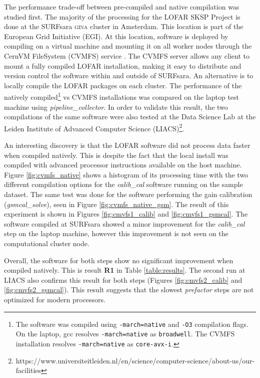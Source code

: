 The performance trade-off between pre-compiled and native compilation was studied first. The majority of the processing for the LOFAR SKSP Project \citep{lotss} is done at the SURFsara \textsc{gina} cluster in Amsterdam. This location is part of the European Grid Initiative (EGI)\citep{SurfSara}. At this location, software is deployed by compiling on a virtual machine and mounting it on all worker nodes through the CernVM FileSystem (CVMFS) service \citep{cvmfs}. The CVMFS server allows any client to mount a fully compiled LOFAR installation, making it easy to distribute and version control the software within and outside of SURFsara. An alternative is to locally compile the LOFAR packages on each cluster. The performance of the natively compiled\footnote{The software was compiled using \texttt{-march=native} and \texttt{-O3} compilation flags. On the laptop, gcc resolves \texttt{-march=native} as \texttt{broadwell}. The CVMFS installation resolves \texttt{-march=native} as \texttt{core-avx-i}.} vs CVMFS installations was compared on the laptop test machine using \textit{pipeline\_collector}. In order to validate this result, the two compilations of the same software were also tested at the Data Science Lab at the Leiden Institute of Advanced Computer Science (LIACS)\footnote{https://www.universiteitleiden.nl/en/science/computer-science/about-us/our-facilities}. 
 
An interesting discovery is that the LOFAR software did not process data faster when compiled natively. This is despite the fact that the local install was compiled with advanced processor instructions available on the host machine.  Figure \ref{fig:cvmfs_native} shows a histogram of its processing time with the two different compilation options for the \textit{calib\_cal} software running on the sample dataset. The same test was done for the software performing the gain calibration (\textit{gsmcal\_solve}), seen in Figure \ref{fig:cvmfs_native_gsm}. The result of this experiment is shown in Figures \ref{fig:cmvfs1_calib} and \ref{fig:cmvfs1_gsmcal}.  The software compiled at SURFsara showed a minor improvement for the \textit{calib\_cal} step on the laptop machine, however this improvement is not seen on the computational cluster node. 

Overall, the software for both steps show no significant improvement when compiled natively. This is result \textbf{R1} in Table \ref{table:results}. The second run at LIACS also confirms this result for both steps (Figures \ref{fig:cmvfs2_calib} and \ref{fig:cmvfs2_gsmcal}). This result suggests that the slowest \textit{prefactor} steps are not optimized for modern processors. 

